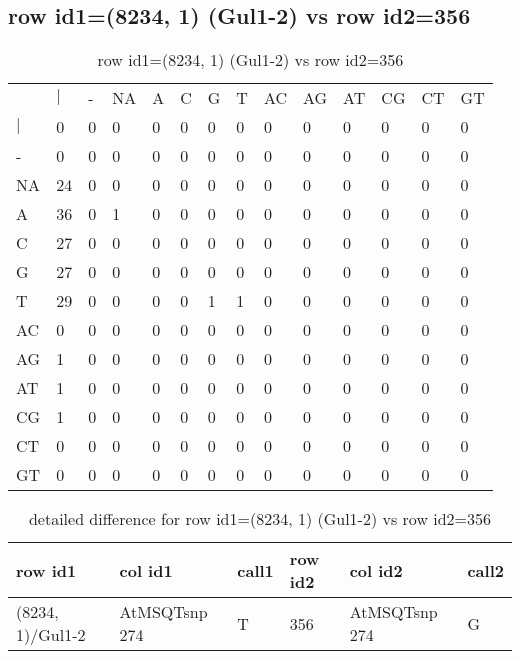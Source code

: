 \subsection{row id1=(8234, 1) (Gul1-2) vs row id2=356}
\begin{center}
\begin{longtable}{|l|l|l|l|l|l|l|l|l|l|l|l|l|l|}
\caption{row id1=(8234, 1) (Gul1-2) vs row id2=356} \label{table_dm358}\\
\hline
\\
\hline
&$|$&-&NA&A&C&G&T&AC&AG&AT&CG&CT&GT\\
$|$&0&0&0&0&0&0&0&0&0&0&0&0&0\\
-&0&0&0&0&0&0&0&0&0&0&0&0&0\\
NA&24&0&0&0&0&0&0&0&0&0&0&0&0\\
A&36&0&1&0&0&0&0&0&0&0&0&0&0\\
C&27&0&0&0&0&0&0&0&0&0&0&0&0\\
G&27&0&0&0&0&0&0&0&0&0&0&0&0\\
T&29&0&0&0&0&1&1&0&0&0&0&0&0\\
AC&0&0&0&0&0&0&0&0&0&0&0&0&0\\
AG&1&0&0&0&0&0&0&0&0&0&0&0&0\\
AT&1&0&0&0&0&0&0&0&0&0&0&0&0\\
CG&1&0&0&0&0&0&0&0&0&0&0&0&0\\
CT&0&0&0&0&0&0&0&0&0&0&0&0&0\\
GT&0&0&0&0&0&0&0&0&0&0&0&0&0\\
\hline
\end{longtable}
\end{center}

\begin{center}
\begin{longtable}{|l|l|l|l|l|l|}
\caption{detailed difference for row id1=(8234, 1) (Gul1-2) vs row id2=356} \label{table_dm359}\\
\hline
row id1&col id1&call1&row id2&col id2&call2\\
\hline
(8234, 1)/Gul1-2&AtMSQTsnp 274&T&356&AtMSQTsnp 274&G\\
\hline
\end{longtable}
\end{center}

